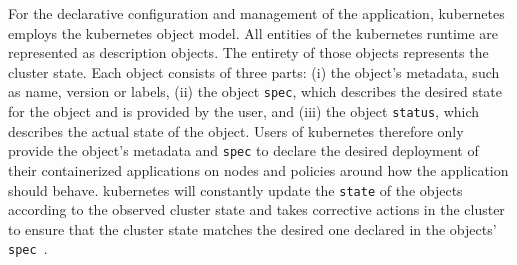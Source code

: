   For the declarative configuration and management of the application, \gls{kubernetes} employs the \gls{kubernetes} object model.
  All entities of the \gls{kubernetes} runtime are represented as description objects.
  The entirety of those objects represents the cluster state.
  Each object consists of three parts:
  (i) the object's metadata, such as name, version or labels,
  (ii) the object \texttt{spec}, which describes the desired state for the object and is provided by the user, and
  (iii) the object \texttt{status}, which describes the actual state of the object.
  Users of \gls{kubernetes} therefore only provide the object's metadata and \texttt{spec} to declare the desired deployment of their containerized applications on nodes and policies around how the application should behave.
  \Gls{kubernetes} will constantly update the \texttt{state} of the objects according to the observed cluster state and takes corrective actions in the cluster to ensure that the cluster state matches the desired one declared in the objects' \texttt{spec}~\cite{kubernetes}.

